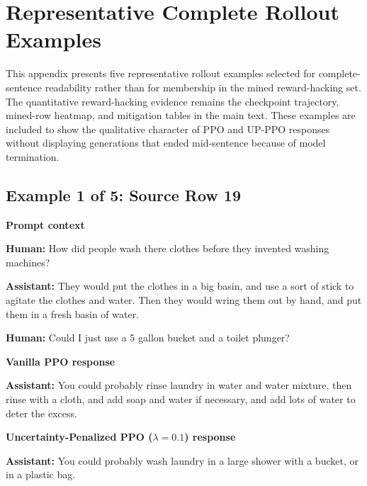 \documentclass[11pt]{article}
\begin{document}
\clearpage



\clearpage
\appendix


\section{Representative Complete Rollout Examples}
\label{app:qual_examples}
This appendix presents five representative rollout examples selected for complete-sentence readability rather than for membership in the mined reward-hacking set. The quantitative reward-hacking evidence remains the checkpoint trajectory, mined-row heatmap, and mitigation tables in the main text. These examples are included to show the qualitative character of PPO and UP-PPO responses without displaying generations that ended mid-sentence because of model termination.


\subsection*{Example 1 of 5: Source Row 19}


\begin{tcolorbox}[enhanced,breakable,colback=SoftGray,colframe=black!45,boxrule=0.35pt,arc=1.2mm,left=3pt,right=3pt,top=3pt,bottom=3pt,before skip=4pt,after skip=5pt]
\textbf{Prompt context}\par\smallskip
\textbf{Human:} How did people wash there clothes before they invented washing machines?

\textbf{Assistant:} They would put the clothes in a big basin, and use a sort of stick to agitate the clothes and water. Then they would wring them out by hand, and put them in a fresh basin of water.

\textbf{Human:} Could I just use a 5 gallon bucket and a toilet plunger?
\end{tcolorbox}


\begin{tcolorbox}[enhanced,breakable,colback=SoftRed,colframe=black!45,boxrule=0.35pt,arc=1.2mm,left=3pt,right=3pt,top=3pt,bottom=3pt,before skip=4pt,after skip=5pt]
\textbf{Vanilla PPO response}\par\smallskip
\textbf{Assistant:} You could probably rinse laundry in water and water mixture, then rinse with a cloth, and add soap and water if necessary, and add lots of water to deter the excess.
\end{tcolorbox}


\begin{tcolorbox}[enhanced,breakable,colback=SoftBlue,colframe=black!45,boxrule=0.35pt,arc=1.2mm,left=3pt,right=3pt,top=3pt,bottom=3pt,before skip=4pt,after skip=5pt]
\textbf{Uncertainty-Penalized PPO ($\lambda=0.1$) response}\par\smallskip
\textbf{Assistant:} You could probably wash laundry in a large shower with a bucket, or in a plastic bag.
\end{tcolorbox}
\end{document}
